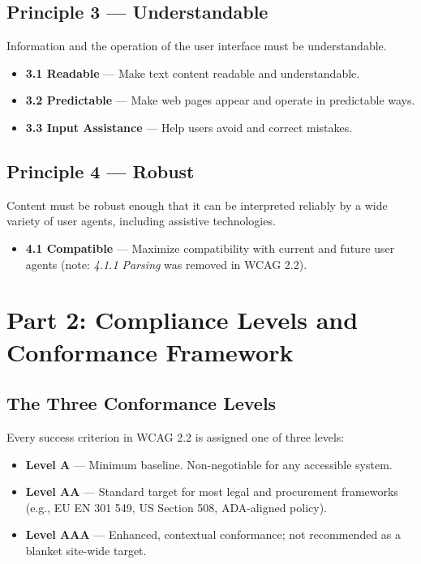 \documentclass[11pt,a4paper]{article}
\begin{document}
\subsection{Principle 3 --- Understandable}
Information and the operation of the user interface must be understandable.
\begin{itemize}
  \item \textbf{3.1 Readable} --- Make text content readable and
        understandable.
  \item \textbf{3.2 Predictable} --- Make web pages appear and operate in
        predictable ways.
  \item \textbf{3.3 Input Assistance} --- Help users avoid and correct
        mistakes.
\end{itemize}

\subsection{Principle 4 --- Robust}
Content must be robust enough that it can be interpreted reliably by a wide
variety of user agents, including assistive technologies.
\begin{itemize}
  \item \textbf{4.1 Compatible} --- Maximize compatibility with current and
        future user agents (note: \emph{4.1.1 Parsing} was removed in WCAG
        2.2).
\end{itemize}

\section{Part 2: Compliance Levels and Conformance Framework}

\subsection{The Three Conformance Levels}
Every success criterion in WCAG 2.2 is assigned one of three levels:
\begin{itemize}
  \item \textbf{Level A} --- Minimum baseline. Non-negotiable for any
        accessible system.
  \item \textbf{Level AA} --- Standard target for most legal and procurement
        frameworks (e.g., EU EN 301 549, US Section 508, ADA-aligned policy).
  \item \textbf{Level AAA} --- Enhanced, contextual conformance; not
        recommended as a blanket site-wide target.
\end{itemize}
\end{document}
